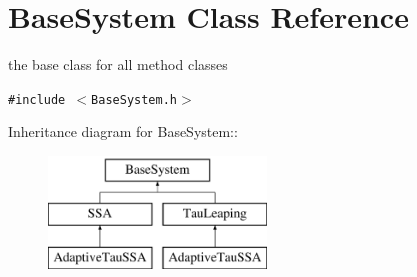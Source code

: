 \hypertarget{class_base_system}{
\section{BaseSystem Class Reference}
\label{class_base_system}
}
the base class for all method classes  


{\tt \#include $<$BaseSystem.h$>$}

Inheritance diagram for BaseSystem::\begin{figure}[H]
\begin{center}
\leavevmode
\includegraphics[height=3cm]{class_base_system}
\end{center}
\end{figure}
